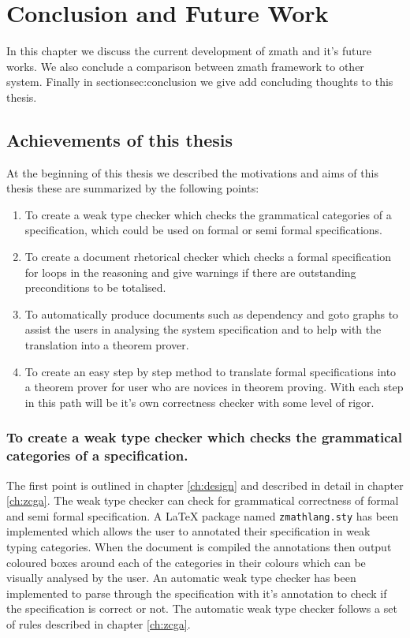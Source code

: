 \chapter{Conclusion and Future Work}
\label{ch:conclusion}

In this chapter we discuss the current development of \gls{zmath} and it's
future works. We also conclude a comparison between \gls{zmath} framework to
other system. Finally in section{sec:conclusion} we give add concluding thoughts
to this thesis.


\section{Achievements of this thesis}

At the beginning of this thesis we described the motivations and aims of this
thesis these are summarized by the following points:

\begin{enumerate}

\item To create a weak type checker which checks the grammatical categories of a
specification, which could be used on formal or semi formal specifications.

\item To create a document rhetorical checker which checks a formal
specification for loops in the reasoning and give warnings if there are
outstanding preconditions to be totalised.

\item To automatically produce documents such as dependency and goto graphs to
assist the users in analysing the system specification and to help with the
translation into a theorem prover.

\item To create an easy step by step method to translate formal specifications
into a theorem prover for user who are novices in theorem proving. With each step
in this path will be it's own correctness checker with some level of rigor.

\end{enumerate}

\subsection{To create a weak type checker which checks the grammatical categories of a specification.}

The first point is outlined in chapter \ref{ch:design} and described in detail
in chapter \ref{ch:zcga}. The weak type checker can check for grammatical
correctness of formal and semi formal specification. A \LaTeX{} package named
\texttt{zmathlang.sty} has been implemented which allows the user to annotated
their specification in weak typing categories. When the document is compiled the
annotations then output coloured boxes around each of the categories in their
colours which can be visually analysed by the user. An automatic weak type
checker has been implemented to parse through the specification with it's
annotation to check if the specification is correct or not. The automatic weak
type checker follows a set of rules described in chapter \ref{ch:zcga}.

